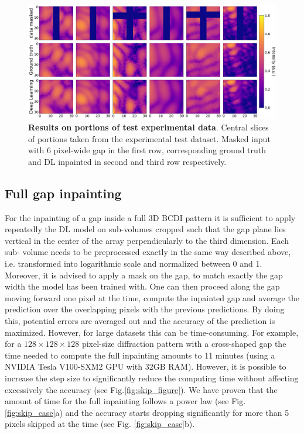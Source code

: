 \begin{figure}[h]
    \centering
    \includegraphics[width=\textwidth]{figures/Inpainting/prediction_small_experiment.pdf}
    \caption{\textbf{Results on portions of test experimental data}. Central slices of portions taken from the experimental test
    dataset. Masked input with 6 pixel-wide gap in the first row, corresponding ground truth and DL inpainted in second and third
    row respectively.}
    \label{fig:pred_portions_exp}
\end{figure}

\subsection{Full gap inpainting}\label{sec:full_gap}

For the inpainting of a gap inside a full 3D BCDI pattern it is sufficient to apply repeatedly the DL model on sub-volumes 
cropped such that the gap plane lies vertical in the center of the array perpendicularly to the third dimension. Each sub-
volume needs to be preprocessed exactly in the same way described above, i.e. transformed into logarithmic scale and 
normalized between 0 and 1. Moreover, it is advised to apply a mask on the gap, to match exactly the gap width the model
has been trained with. 
One can then proceed along the gap moving forward one pixel at the time, compute the inpainted gap and average the prediction
over the overlapping pixels with the previous predictions. By doing this, potential errors are averaged out and the accuracy
of the prediction is maximized. However, for large datasets this can be time-consuming. For example, for a $128\times128\times128$ pixel-size
diffraction pattern with a cross-shaped gap the time needed to compute the full inpainting amounts to 11 minutes (using a 
NVIDIA Tesla V100-SXM2 GPU with 32GB RAM). However, it is possible to increase the step size to significantly reduce the computing
time without affecting excessively the accuracy (see Fig.\ref{fig:skip_figure}). We have proven that the amount of time for the full inpainting follows a power 
law (see Fig. \ref{fig:skip_case}a) and the accuracy starts dropping significantly for more than 5 pixels skipped at the time
(see Fig. \ref{fig:skip_case}b).  

